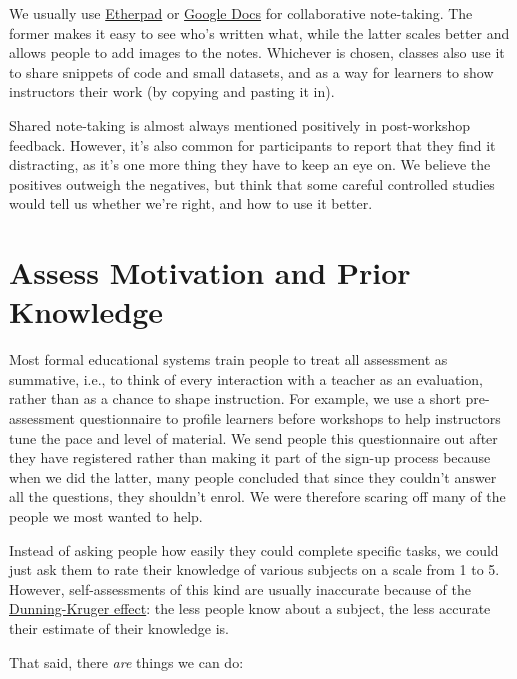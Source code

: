 \documentclass[10pt,statementpaper]{memoir}
\begin{document}
We usually use \href{http://etherpad.org}{Etherpad} or
\href{https://docs.google.com}{Google Docs} for collaborative
note-taking. The former makes it easy to see who's written what, while
the latter scales better and allows people to add images to the notes.
Whichever is chosen, classes also use it to share snippets of code and
small datasets, and as a way for learners to show instructors their work
(by copying and pasting it in).

Shared note-taking is almost always mentioned positively in
post-workshop feedback. However, it's also common for participants to
report that they find it distracting, as it's one more thing they have
to keep an eye on. We believe the positives outweigh the negatives, but
think that some careful controlled studies would tell us whether we're
right, and how to use it better.

\section{Assess Motivation and Prior
Knowledge}\label{assess-motivation-and-prior-knowledge}

Most formal educational systems train people to treat all assessment as
summative, i.e., to think of every interaction with a teacher as an
evaluation, rather than as a chance to shape instruction. For example,
we use a short pre-assessment questionnaire to profile learners before
workshops to help instructors tune the pace and level of material. We
send people this questionnaire out after they have registered rather
than making it part of the sign-up process because when we did the
latter, many people concluded that since they couldn't answer all the
questions, they shouldn't enrol. We were therefore scaring off many of
the people we most wanted to help.

Instead of asking people how easily they could complete specific tasks,
we could just ask them to rate their knowledge of various subjects on a
scale from 1 to 5. However, self-assessments of this kind are usually
inaccurate because of the
\href{https://en.wikipedia.org/wiki/Dunning\%E2\%80\%93Kruger_effect}{Dunning-Kruger
effect}: the less people know about a subject, the less accurate their
estimate of their knowledge is.

That said, there \emph{are} things we can do:
\end{document}
